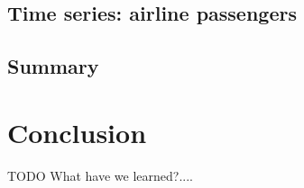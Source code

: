 \documentclass[a4paper, 10pt, conference]{ieeeconf}
\begin{document}
\label{subsec:reg_affairs}
\subsection{Time series: airline passengers}
\label{subsec:ts_airpas}

\subsection{Summary}
\label{subsec:summary_creative_part}

\section{Conclusion}
TODO
What have we learned?....


\addtolength{\textheight}{-12cm}  



\end{document}
